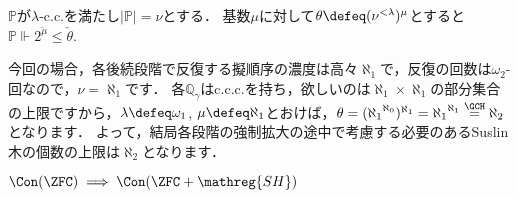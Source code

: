 \documentclass[a4j]{ltjsarticle}
\newcommand{\SH}{\mathreg{SH}}
\begin{document}
\begin{lemma}
 $\mathbb{P}$が$\lambda$-c.c.を満たし$|\mathbb{P}| = \nu$とする．
 基数$\mu$に対して$\theta \defeq (\nu^{<\lambda})^\mu$とすると$\mathbb{P} \Vdash 2^{\check{\mu}} \leq \check{\theta}$.
\end{lemma}

今回の場合，各後続段階で反復する擬順序の濃度は高々$\aleph_1$で，反復の回数は$\omega_2$-回なので，$\nu = \aleph_1$です．
各$\mathbb{Q}_\gamma$はc.c.c.を持ち，欲しいのは$\aleph_1 \times \aleph_1$の部分集合の上限ですから，$\lambda \defeq \omega_1$, $\mu \defeq \aleph_1$とおけば，$\theta = ({\aleph_1}^{\aleph_0})^{\aleph_1} = {\aleph_1}^{\aleph_1} \stackrel{\GCH}{=} \aleph_2$となります．
よって，結局各段階の強制拡大の途中で考慮する必要のあるSuslin木の個数の上限は$\aleph_2$となります．

\begin{theorem}
 $\Con(\ZFC) \implies \Con(\ZFC+\SH)$
\end{theorem}
\end{document}
